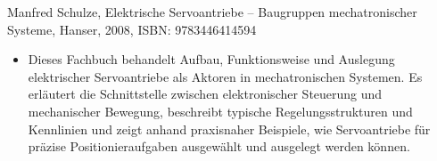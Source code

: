 Manfred Schulze, Elektrische Servoantriebe – Baugruppen mechatronischer Systeme, Hanser, 2008, ISBN: 9783446414594 \cite{Schulze:2008}

\begin{itemize}
	\item Dieses Fachbuch behandelt Aufbau, Funktionsweise und Auslegung elektrischer Servoantriebe als Aktoren in mechatronischen Systemen. Es erläutert die Schnittstelle zwischen elektronischer Steuerung und mechanischer Bewegung, beschreibt typische Regelungsstrukturen und Kennlinien und zeigt anhand praxisnaher Beispiele, wie Servoantriebe für präzise Positionieraufgaben ausgewählt und ausgelegt werden können.
\end{itemize}
